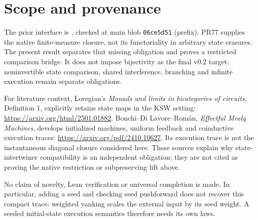 \documentclass{article}
\begin{document}
\section{Scope and provenance}
The prior interface is
, checked at main blob \texttt{06ce5d51} (prefix). PR77 supplies the native finite-measure closure, not its functoriality in arbitrary state erasures. The present result separates that missing obligation and proves a restricted comparison bridge. It does not impose bijectivity as the final v0.2 target: noninvertible state comparison, shared interference, branching and infinite execution remain separate obligations.

For literature context, Loregian's \emph{Monads and limits in bicategories of circuits}, Definition 1, explicitly retains state maps in the KSW setting: \url{https://arxiv.org/html/2501.01882}. Bonchi--Di Lavore--Rom\'an, \emph{Effectful Mealy Machines}, develops initialized machines, uniform feedback and coinductive execution traces: \url{https://arxiv.org/pdf/2410.10627}. Its execution trace is not the instantaneous diagonal closure considered here. These sources explain why state-intertwiner compatibility is an independent obligation; they are not cited as proving the native restriction or subpreserving lift above.

No claim of novelty, Lean verification or universal completion is made. In particular, adding a seed and checking seed pushforward does not recover this compact trace: weighted yanking scales the external input by its seed weight. A seeded initial-state execution semantics therefore needs its own laws.
\end{document}

